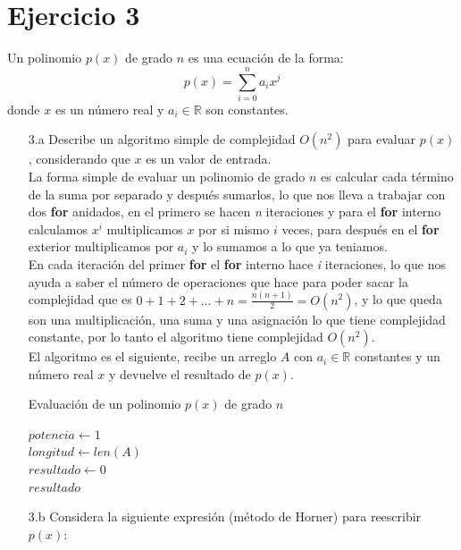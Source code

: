 \documentclass[12pt]{article}
\begin{document}
\section*{Ejercicio 3}
Un polinomio $p(x)$ de grado $n$ es una ecuación de la forma:
\[
    p(x)=\sum_{i=0}^n a_ix^j
\]
donde $x$ es un número real y $a_i \in \mathbb{R}$ son constantes.
\begin{itemize}
    \item[3.a] Describe un algoritmo simple de complejidad $O(n^2)$ para evaluar $p(x)$, considerando que $x$ es un valor de entrada.\\
    La forma simple de evaluar un polinomio de grado $n$ es calcular cada término de la suma por separado y después sumarlos, lo que nos lleva a trabajar con dos \textbf{for} anidados, en el primero se hacen \textit{n} iteraciones y para el \textbf{for} interno calculamos $x^i$ multiplicamos $x$ por si mismo $i$ veces, para después en el \textbf{for} exterior multiplicamos por $a_i$ y lo sumamos a lo que ya teniamos.\\
    En cada iteración del primer \textbf{for} el \textbf{for} interno hace \textit{i} iteraciones, lo que nos ayuda a saber el número de operaciones que hace para poder sacar la complejidad que es $0+1+2+\dots+n = \frac{n(n+1)}{2} = O(n^2)$, y lo que queda son una multiplicación, una suma y una asignación lo que tiene complejidad constante, por lo tanto el algoritmo tiene complejidad $O(n^2)$.\\
    El algoritmo es el siguiente, recibe un arreglo $A$ con $a_i \in \mathbb{R}$ constantes y un número real $x$ y devuelve el resultado de $p(x)$.\\
    \LinesNumbered
    \renewcommand{\algorithmcfname}{Algoritmo}
    \begin{algorithm}[H]
        \caption{Evaluación de un polinomio $p(x)$ de grado $n$}
        $potencia \gets 1$\\
        $longitud \gets len(A)$\\
        $resultado \gets 0$\\
        \Return $resultado$
    \end{algorithm}
    \item[3.b] Considera la siguiente expresión (método de Horner) para reescribir $p(x)$:

\end{itemize}
\end{document}
